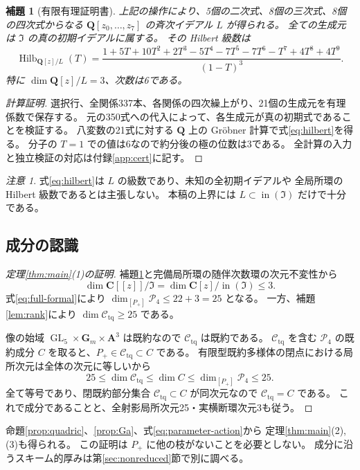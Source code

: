 \documentclass[11pt,a4paper]{ltjsarticle}
\newcommand{\CC}{\mathbf C}
\newcommand{\QQ}{\mathbf Q}
\renewcommand{\AA}{\mathbf A}
\newcommand{\GG}{\mathbf G}
\newcommand{\cP}{\mathcal P_4}
\newcommand{\cC}{\mathcal C_{\mathrm{tq}}}
\DeclareMathOperator{\GL}{GL}
\newtheorem{lemma}[theorem]{補題}
\theoremstyle{remark}
\newtheorem{remark}[theorem]{注意}
\begin{document}
\begin{lemma}[有限有理証明書]\label{lem:initial}
上記の操作により、5個の二次式、8個の三次式、8個の四次式からなる
$\QQ[z_0,\ldots,z_7]$ の斉次イデアル $L$ が得られる。
全ての生成元は $\mathfrak I$ の真の初期イデアルに属する。
その Hilbert 級数は
\begin{equation}\label{eq:hilbert}
 \operatorname{Hilb}_{\QQ[z]/L}(T)=
 \frac{1+5T+10T^2+2T^3-5T^4-7T^5-7T^6-T^7+4T^8+4T^9}
 {(1-T)^3}.
\end{equation}
特に $\dim\QQ[z]/L=3$、次数は6である。
\end{lemma}
\begin{proof}[計算証明]
選択行、全関係337本、各関係の四次繰上がり、21個の生成元を有理係数で保存する。
元の350式への代入によって、各生成元が真の初期式であることを検証する。
八変数の21式に対する $\QQ$ 上の Gröbner 計算で式\eqref{eq:hilbert}を得る。
分子の $T=1$ での値は6なので約分後の極の位数は3である。
全計算の入力と独立検証の対応は付録\ref{app:cert}に記す。
\end{proof}

\begin{remark}
式\eqref{eq:hilbert}は $L$ の級数であり、未知の全初期イデアルや
全局所環の Hilbert 級数であるとは主張しない。
本稿の上界には $L\subset\operatorname{in}(\mathfrak I)$ だけで十分である。
\end{remark}

\subsection{成分の認識}

\begin{proof}[定理\ref{thm:main}(1)の証明]
補題\ref{lem:initial}と完備局所環の随伴次数環の次元不変性から
\[
 \dim\CC[[z]]/\mathfrak I
 =\dim\CC[z]/\operatorname{in}(\mathfrak I)\le3.
\]
式\eqref{eq:full-formal}により $\dim_{[P_+]}\cP\le22+3=25$ となる。
一方、補題\ref{lem:rank}により $\dim\cC\ge25$ である。

像の始域 $\GL_5\times\GG_m\times\AA^3$ は既約なので $\cC$ は既約である。
$\cC$ を含む $\cP$ の既約成分 $C$ を取ると、$P_+\in\cC\subset C$ である。
有限型既約多様体の閉点における局所次元は全体の次元に等しいから
\[
 25\le\dim\cC\le\dim C\le\dim_{[P_+]}\cP\le25.
\]
全て等号であり、閉既約部分集合 $\cC\subset C$ が同次元なので $\cC=C$ である。
これで成分であることと、全射影局所次元25・実横断環次元3も従う。
\end{proof}

命題\ref{prop:quadric}、\ref{prop:Ga}、式\eqref{eq:parameter-action}から
定理\ref{thm:main}(2),(3)も得られる。
この証明は $P_+$ に他の枝がないことを必要としない。
成分に沿うスキーム的厚みは第\ref{sec:nonreduced}節で別に調べる。
\end{document}
